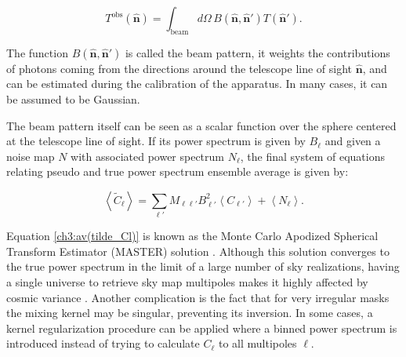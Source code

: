 \documentclass[openany,a4paper,12pt,oneside]{book}
\newcommand{\av}[1]{\left\langle #1 \right\rangle} %
\begin{document}
\begin{spacing}{1.5}
\begin{equation}\label{def:beam_pattern}
	T^\text{obs}(\hat{\mathbf{n}})=\int_\text{beam} d\Omega\, B(\hat{\mathbf{n}}, \hat{\mathbf{n}}') T(\hat{\mathbf{n}} ').
\end{equation}

The function $B(\hat{\mathbf{n}}, \hat{\mathbf{n}}')$ is called the beam pattern, it weights the contributions of photons coming from the directions around the telescope line of sight $\hat{\mathbf{n}}$, and can be estimated during the calibration of the apparatus. In many cases, it can be assumed to be Gaussian. %


The beam pattern itself can be seen as a scalar function over the sphere centered at the telescope line of sight. If its power spectrum is given by $B_\ell$ and given a noise map $N$ with associated power spectrum $N_\ell$, the final system of equations relating pseudo and true power spectrum ensemble average is given by:

\begin{equation}\label{ch3:av(tilde_Cl)}
    \av{\tilde{C}_\ell}=\sum_{\ell'} M_{\ell \ell'}B_{\ell'}^2\av{C_{\ell'}}+\av{N_\ell}.
\end{equation}

Equation \eqref{ch3:av(tilde_Cl)} is known as the Monte Carlo Apodized
Spherical Transform Estimator (MASTER) solution \cite{Hivon_2002}. Although this solution converges to the true power spectrum in the limit of a large number of sky realizations, having a single universe to retrieve sky map multipoles makes it highly affected by cosmic variance \cite{Moura-Santos_2016}. Another complication is the fact that for very irregular masks the mixing kernel may be singular, preventing its inversion. In some cases, a kernel regularization procedure can be applied where a binned power spectrum is introduced instead of trying to calculate $C_{\ell}$ to all multipoles $\ell$.


\end{spacing}
\end{document}
